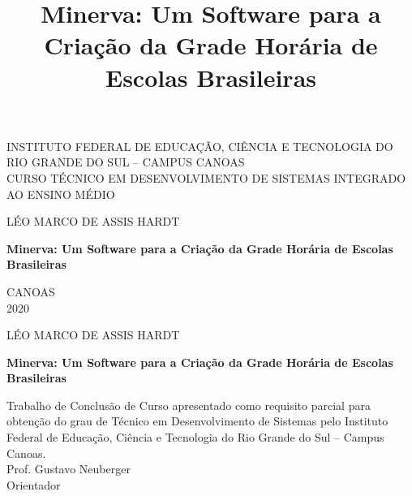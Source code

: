 \documentclass[12pt,a4paper]{article}
\title{Minerva:  Um Software para a Criação da Grade Horária de Escolas Brasileiras}
\newenvironment{bottompar}{\par\vspace*{\fill}}{\clearpage}
\begin{document}
	\thispagestyle{empty}

	\begin{center}
		INSTITUTO FEDERAL DE EDUCAÇÃO, CIÊNCIA E TECNOLOGIA DO RIO GRANDE DO SUL -- CAMPUS CANOAS \\
		CURSO TÉCNICO EM DESENVOLVIMENTO DE SISTEMAS INTEGRADO AO ENSINO MÉDIO\\
	\end{center}

	\vskip 3cm

	\begin{center}
		LÉO MARCO DE ASSIS HARDT
	\end{center}

	\vskip 5cm

	\begin{center}
		\textbf{Minerva:  Um Software para a Criação da Grade Horária de Escolas Brasileiras}
	\end{center}


	\begin{bottompar}
		\begin{center}
		CANOAS \\
		2020
		\end{center}
	\end{bottompar}

	\thispagestyle{empty}

	\begin{center}
		LÉO MARCO DE ASSIS HARDT
	\end{center}

	\vskip 3cm


	\begin{center}
		\textbf{Minerva:  Um Software para a Criação da Grade Horária de Escolas Brasileiras}
	\end{center}

	\vskip 2cm

	\begin{addmargin}[7.5cm]{0em}

		\setlength{\parindent}{0mm}
		Trabalho de Conclusão de Curso apresentado como requisito parcial para obtenção do grau de Técnico em Desenvolvimento de Sistemas pelo Instituto Federal de Educação, Ciência e Tecnologia do Rio Grande do Sul – Campus Canoas.\\

		Prof. Gustavo Neuberger\\
		Orientador

	\end{addmargin}
\end{document}
